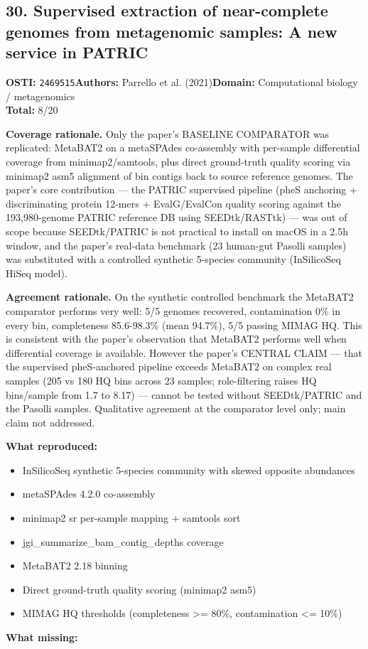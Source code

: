 \subsection{30. Supervised extraction of near-complete genomes from metagenomic samples: A new service in PATRIC}
\textbf{OSTI:} \texttt{2469515}\quad\textbf{Authors:} Parrello et al. (2021)\quad\textbf{Domain:} Computational biology / metagenomics\\
\quad{}\quad\textbf{Total:} 8/20\par\smallskip
\noindent\textbf{Coverage rationale.} Only the paper's BASELINE COMPARATOR was replicated: MetaBAT2 on a metaSPAdes co-assembly with per-sample differential coverage from minimap2/samtools, plus direct ground-truth quality scoring via minimap2 asm5 alignment of bin contigs back to source reference genomes. The paper's core contribution --- the PATRIC supervised pipeline (pheS anchoring + discriminating protein 12-mers + EvalG/EvalCon quality scoring against the 193,980-genome PATRIC reference DB using SEEDtk/RASTtk) --- was out of scope because SEEDtk/PATRIC is not practical to install on macOS in a 2.5h window, and the paper's real-data benchmark (23 human-gut Pasolli samples) was substituted with a controlled synthetic 5-species community (InSilicoSeq HiSeq model).\par
\noindent\textbf{Agreement rationale.} On the synthetic controlled benchmark the MetaBAT2 comparator performs very well: 5/5 genomes recovered, contamination 0\% in every bin, completeness 85.6-98.3\% (mean 94.7\%), 5/5 passing MIMAG HQ. This is consistent with the paper's observation that MetaBAT2 performs well when differential coverage is available. However the paper's CENTRAL CLAIM --- that the supervised pheS-anchored pipeline exceeds MetaBAT2 on complex real samples (205 vs 180 HQ bins across 23 samples; role-filtering raises HQ bins/sample from 1.7 to 8.17) --- cannot be tested without SEEDtk/PATRIC and the Pasolli samples. Qualitative agreement at the comparator level only; main claim not addressed.\par\smallskip
\noindent\textbf{What reproduced:}
\begin{itemize}[leftmargin=1.4em,itemsep=0.2em,topsep=0.2em]
\item InSilicoSeq synthetic 5-species community with skewed opposite abundances
\item metaSPAdes 4.2.0 co-assembly
\item minimap2 sr per-sample mapping + samtools sort
\item jgi\_summarize\_bam\_contig\_depths coverage
\item MetaBAT2 2.18 binning
\item Direct ground-truth quality scoring (minimap2 asm5)
\item MIMAG HQ thresholds (completeness \textgreater{}= 80\%, contamination \textless{}= 10\%)
\end{itemize}\noindent\textbf{What missing:}
